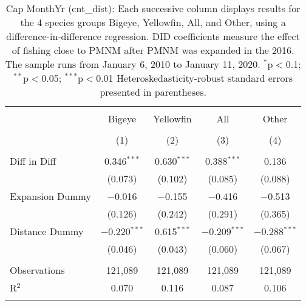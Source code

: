 
\begin{table}[!htbp] \centering 
  \caption{Cap MonthYr (cnt_dist): Each successive column displays results for the 4 species groups Bigeye, Yellowfin, All, and Other, using a difference-in-difference regression. DID coefficients measure the effect of fishing close to PMNM after PMNM was expanded in the 2016. The sample runs from January 6, 2010 to January 11, 2020. $^{*}$p$<$0.1; $^{**}$p$<$0.05; $^{***}$p$<$0.01 Heteroskedasticity-robust standard errors presented in parentheses.} 
  \label{tbl:timeFEcnt_dist} 
\begin{tabular}{@{\extracolsep{5pt}}lcccc} 
\\[-1.8ex]\hline 
\hline \\[-1.8ex] 
 & Bigeye & Yellowfin & All & Other \\ 
\\[-1.8ex] & (1) & (2) & (3) & (4)\\ 
\hline \\[-1.8ex] 
 Diff in Diff & 0.346$^{***}$ & 0.630$^{***}$ & 0.388$^{***}$ & 0.136 \\ 
  & (0.073) & (0.102) & (0.085) & (0.088) \\ 
  Expansion Dummy & $-$0.016 & $-$0.155 & $-$0.416 & $-$0.513 \\ 
  & (0.126) & (0.242) & (0.291) & (0.365) \\ 
  Distance Dummy & $-$0.220$^{***}$ & 0.615$^{***}$ & $-$0.209$^{***}$ & $-$0.288$^{***}$ \\ 
  & (0.046) & (0.043) & (0.060) & (0.067) \\ 
 \hline \\[-1.8ex] 
Observations & 121,089 & 121,089 & 121,089 & 121,089 \\ 
R$^{2}$ & 0.070 & 0.116 & 0.087 & 0.106 \\ 
\hline 
\hline \\[-1.8ex] 
\end{tabular} 
\end{table} 
